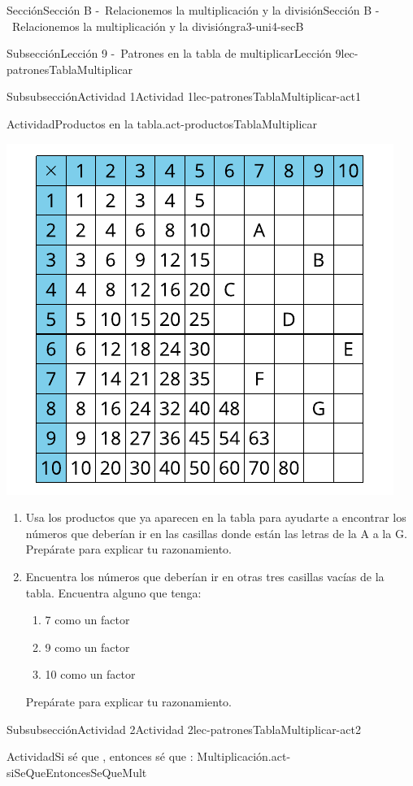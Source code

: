 \documentclass[twoside,10pt,]{article}
\begin{document}
\begin{sectionptx}{Sección}{Sección B -~Relacionemos la multiplicación y la división}{}{Sección B -~Relacionemos la multiplicación y la división}{}{}{gra3-uni4-secB}
\begin{subsectionptx}{Subsección}{Lección 9 -~Patrones en la tabla de multiplicar}{}{Lección 9}{}{}{lec-patronesTablaMultiplicar}
\begin{subsubsectionptx}{Subsubsección}{Actividad 1}{}{Actividad 1}{}{}{lec-patronesTablaMultiplicar-act1}
\begin{activity}{Actividad}{Productos en la tabla.}{act-productosTablaMultiplicar}
\begin{image}{0}{1}{0}{}
\includegraphics[width=\linewidth]{external/svg-source/tikz-file-152978-scale13.pdf}
\end{image}%
%
\begin{enumerate}
\item{}Usa los productos que ya aparecen en la tabla para ayudarte a encontrar los números que deberían ir en las casillas donde están las letras de la A a la G. Prepárate para explicar tu razonamiento.%
\item{}Encuentra los números que deberían ir en otras tres casillas vacías de la tabla. Encuentra alguno que tenga:%
%
\begin{enumerate}
\item{}7 como un factor%
\item{}9 como un factor%
\item{}10 como un factor%
\end{enumerate}
Prepárate para explicar tu razonamiento.%
\end{enumerate}
\end{activity}%
\end{subsubsectionptx}
%
%
\typeout{************************************************}
\typeout{************************************************}
%
\begin{subsubsectionptx}{Subsubsección}{Actividad 2}{}{Actividad 2}{}{}{lec-patronesTablaMultiplicar-act2}
\begin{activity}{Actividad}{Si sé que \textellipsis{}, entonces sé que \textellipsis{}: Multiplicación.}{act-siSeQueEntoncesSeQueMult}%

\end{activity}
\end{subsubsectionptx}
\end{subsectionptx}
\end{sectionptx}
\end{document}
